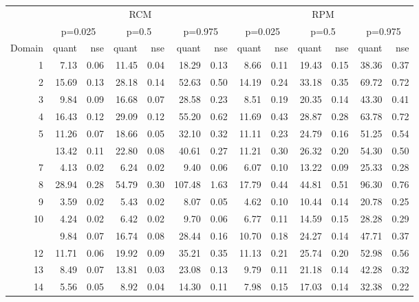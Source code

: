 
\begin{tabular}[t]{rrrrrrrrrrrrr}
\toprule
\multicolumn{1}{c}{ } & \multicolumn{6}{c}{RCM} & \multicolumn{6}{c}{RPM} \\
\cmidrule(l{3pt}r{3pt}){2-7} \cmidrule(l{3pt}r{3pt}){8-13}
\multicolumn{1}{c}{ } & \multicolumn{2}{c}{p=0.025} & \multicolumn{2}{c}{p=0.5} & \multicolumn{2}{c}{p=0.975} & \multicolumn{2}{c}{p=0.025} & \multicolumn{2}{c}{p=0.5} & \multicolumn{2}{c}{p=0.975} \\
\cmidrule(l{3pt}r{3pt}){2-3} \cmidrule(l{3pt}r{3pt}){4-5} \cmidrule(l{3pt}r{3pt}){6-7} \cmidrule(l{3pt}r{3pt}){8-9} \cmidrule(l{3pt}r{3pt}){10-11} \cmidrule(l{3pt}r{3pt}){12-13}
Domain & quant & nse & quant & nse & quant & nse & quant & nse & quant & nse & quant & nse\\
\midrule
1 & 7.13 & 0.06 & 11.45 & 0.04 & 18.29 & 0.13 & 8.66 & 0.11 & 19.43 & 0.15 & 38.36 & 0.37\\
2 & 15.69 & 0.13 & 28.18 & 0.14 & 52.63 & 0.50 & 14.19 & 0.24 & 33.18 & 0.35 & 69.72 & 0.72\\
3 & 9.84 & 0.09 & 16.68 & 0.07 & 28.58 & 0.23 & 8.51 & 0.19 & 20.35 & 0.14 & 43.30 & 0.41\\
4 & 16.43 & 0.12 & 29.09 & 0.12 & 55.20 & 0.62 & 11.69 & 0.43 & 28.87 & 0.28 & 63.78 & 0.72\\
5 & 11.26 & 0.07 & 18.66 & 0.05 & 32.10 & 0.32 & 11.11 & 0.23 & 24.79 & 0.16 & 51.25 & 0.54\\
\addlinespace
6 & 13.42 & 0.11 & 22.80 & 0.08 & 40.61 & 0.27 & 11.21 & 0.30 & 26.32 & 0.20 & 54.30 & 0.50\\
7 & 4.13 & 0.02 & 6.24 & 0.02 & 9.40 & 0.06 & 6.07 & 0.10 & 13.22 & 0.09 & 25.33 & 0.28\\
8 & 28.94 & 0.28 & 54.79 & 0.30 & 107.48 & 1.63 & 17.79 & 0.44 & 44.81 & 0.51 & 96.30 & 0.76\\
9 & 3.59 & 0.02 & 5.43 & 0.02 & 8.07 & 0.05 & 4.62 & 0.10 & 10.44 & 0.14 & 20.78 & 0.25\\
10 & 4.24 & 0.02 & 6.42 & 0.02 & 9.70 & 0.06 & 6.77 & 0.11 & 14.59 & 0.15 & 28.28 & 0.29\\
\addlinespace
11 & 9.84 & 0.07 & 16.74 & 0.08 & 28.44 & 0.16 & 10.70 & 0.18 & 24.27 & 0.14 & 47.71 & 0.37\\
12 & 11.71 & 0.06 & 19.92 & 0.09 & 35.21 & 0.35 & 11.13 & 0.21 & 25.74 & 0.20 & 52.98 & 0.56\\
13 & 8.49 & 0.07 & 13.81 & 0.03 & 23.08 & 0.13 & 9.79 & 0.11 & 21.18 & 0.14 & 42.28 & 0.32\\
14 & 5.56 & 0.05 & 8.92 & 0.04 & 14.30 & 0.11 & 7.98 & 0.15 & 17.03 & 0.14 & 32.38 & 0.22\\

\end{tabular}

